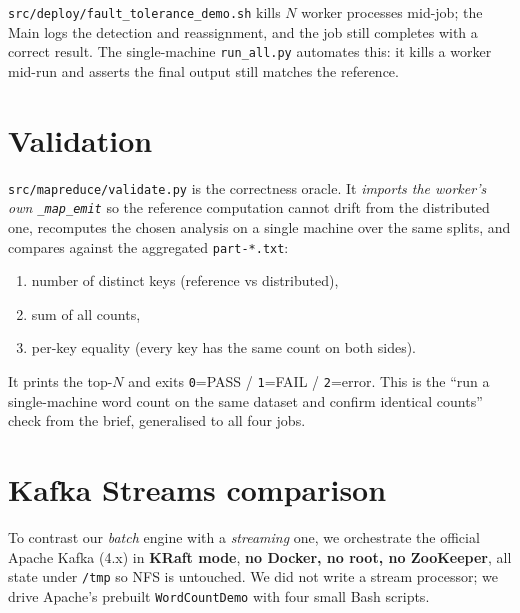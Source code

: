\documentclass[11pt,a4paper]{article}
\newcommand{\code}[1]{\texttt{\small #1}}
\begin{document}
\code{src/deploy/fault\_tolerance\_demo.sh} kills $N$ worker processes mid-job;
the Main logs the detection and reassignment, and the job still completes with a
correct result. The single-machine \code{run\_all.py} automates this: it kills a
worker mid-run and asserts the final output still matches the reference.

\section{Validation}\label{sec:validate}

\code{src/mapreduce/validate.py} is the correctness oracle. It \emph{imports the
worker's own \code{\_map\_emit}} so the reference computation cannot drift from
the distributed one, recomputes the chosen analysis on a single machine over the
same splits, and compares against the aggregated \code{part-*.txt}:

\begin{enumerate}
\item number of distinct keys (reference vs distributed),
\item sum of all counts,
\item per-key equality (every key has the same count on both sides).
\end{enumerate}

It prints the top-$N$ and exits \code{0}=PASS / \code{1}=FAIL / \code{2}=error.
This is the ``run a single-machine word count on the same dataset and confirm
identical counts'' check from the brief, generalised to all four jobs.

\section{Kafka Streams comparison}\label{sec:kafka}

To contrast our \emph{batch} engine with a \emph{streaming} one, we orchestrate
the official Apache Kafka (4.x) in \textbf{KRaft mode}, \textbf{no Docker, no
root, no ZooKeeper}, all state under \code{/tmp} so NFS is untouched. We did not
write a stream processor; we drive Apache's prebuilt \code{WordCountDemo} with
four small Bash scripts.
\end{document}
